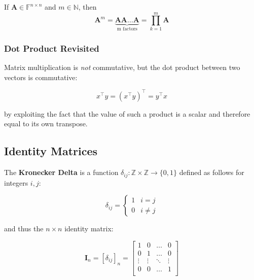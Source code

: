 \documentclass{article}
\begin{document}
\begin{definition}
    If $\mathbf{A} \in \mathbb{F}^{n\times n}$ and $m \in \mathbb{N}$, then 
    \begin{equation*}
        \mathbf{A}^m = \underbrace{\mathbf{A}\mathbf{A}\dots\mathbf{A}}_{\text{m factors}} = \prod_{k=1}^{m} \mathbf{A}
    \end{equation*}
\end{definition}

\subsubsection{Dot Product Revisited}
Matrix multiplication is \textit{not} commutative, but the dot product between two vectors is commutative:

\begin{equation}
    x^{\top}y = (x^{\top}y)^{\top} = y^{\top}x
\end{equation}


\noindent by exploiting the fact that the value of such a product is a scalar and therefore equal to its own transpose. 

\subsection{Identity Matrices}
The \textbf{Kronecker Delta} is a function $\delta_{ij}: \mathbb{Z} \times \mathbb{Z} \rightarrow \{0,1\}$ defined as follows for integers $i,j$:

\begin{equation*}
    \delta_{ij} = \begin{cases}
        1 & i = j \\ 
        0 & i \neq j
    \end{cases}
\end{equation*}

\noindent and thus the $n \times n$ identity matrix: 

\begin{equation*}
    \mathbf{I}_n = [\delta_{ij}]_n = \begin{bmatrix}
        1 & 0 & \dots & 0 \\ 
        0 & 1 & \dots & 0 \\
        \vdots & \vdots & \ddots & \vdots \\
        0 & 0 & \dots & 1 \\
    \end{bmatrix}
\end{equation*}
\end{document}
